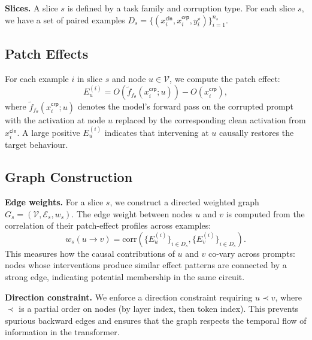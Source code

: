 \documentclass[11pt,a4paper]{article}
\newcommand{\corr}{\mathrm{corr}}
\newcommand{\node}{\mathcal{V}}
\newcommand{\edge}{\mathcal{E}}
\newcommand{\weight}{w}
\newcommand{\patch}[2]{\tilde{f}_{#1}(#2)}
\newcommand{\target}{y^\star}
\newcommand{\slicedata}{D_s}
\begin{document}
\textbf{Slices.} A slice $s$ is defined by a task family and corruption type. For each slice $s$, we have a set of paired examples $\slicedata = \{(x_i^{\textsf{cln}}, x_i^{\textsf{crp}}, \target_i)\}_{i=1}^{n_s}$.

\subsection{Patch Effects}

For each example $i$ in slice $s$ and node $u \in \node$, we compute the patch effect:
\begin{equation}
E_u^{(i)} = O(\patch{f_\theta}{x_i^{\textsf{crp}}; u}) - O(x_i^{\textsf{crp}}),
\end{equation}
where $\patch{f_\theta}{x_i^{\textsf{crp}}; u}$ denotes the model's forward pass on the corrupted prompt with the activation at node $u$ replaced by the corresponding clean activation from $x_i^{\textsf{cln}}$. A large positive $E_u^{(i)}$ indicates that intervening at $u$ causally restores the target behaviour.

\subsection{Graph Construction}

\textbf{Edge weights.} For a slice $s$, we construct a directed weighted graph $G_s = (\node, \edge_s, \weight_s)$. The edge weight between nodes $u$ and $v$ is computed from the correlation of their patch-effect profiles across examples:
\begin{equation}
\weight_s(u \rightarrow v) = \corr\left(\{E_u^{(i)}\}_{i \in \slicedata}, \{E_v^{(i)}\}_{i \in \slicedata}\right).
\end{equation}
This measures how the causal contributions of $u$ and $v$ co-vary across prompts: nodes whose interventions produce similar effect patterns are connected by a strong edge, indicating potential membership in the same circuit.

\textbf{Direction constraint.} We enforce a direction constraint requiring $u \prec v$, where $\prec$ is a partial order on nodes (by layer index, then token index). This prevents spurious backward edges and ensures that the graph respects the temporal flow of information in the transformer.
\end{document}

